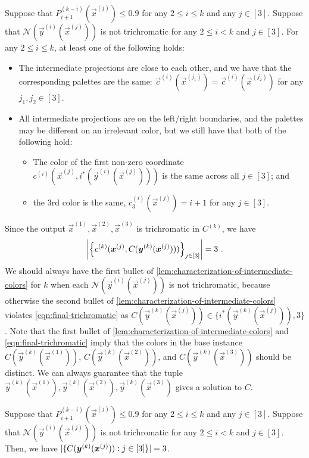 \begin{lemma}
    \label{lem:characterization-of-intermediate-colors}
    Suppose that $P_{i+1}^{(k-i)}(\vec{x}^{(j)})\leq 0.9$ for any $2\leq i\leq k$ and any $j\in [3]$.
    Suppose that $\mathcal{N}(\vec{y}^{(i)}(\vec{x}^{(j)}))$ is not trichromatic for any $2\leq i<k$ and $j\in [3]$. 
    For any $2\leq i\leq k$, at least one of the following holds:
    \begin{itemize}
        \item The intermediate projections are close to each other, and we have that the corresponding palettes are the same: $\vec{c}^{(i)}(\vec{x}^{(j_1)})=\vec{c}^{(i)}(\vec{x}^{(j_2)})$ for any $j_1,j_2\in [3]$.
        \item All intermediate projections are on the left/right boundaries, and the palettes may be different on an irrelevant color, but we still have that both of the following hold: 
        \begin{itemize}
            \item The color of the first non-zero coordinate $c^{(i)}\left(\vec{x}^{(j)}, i^*(\vec{y}^{(i)}(\vec{x}^{(j)}))\right)$ is the same across all  $j\in [3]$; and
            \item the 3rd color is the same, $c^{(i)}_3(\vec{x}^{(j)})=i+1$ for any $j\in [3]$.
        \end{itemize} 
    \end{itemize}
\end{lemma}

Since the output $\vec{x}^{(1)}, \vec{x}^{(2)}, \vec{x}^{(3)}$ is trichromatic in $C^{(k)}$, we have 
\begin{align}
    \label{eqn:final-trichromatic}
    \left |{\left \{{c^{(k)}(\boldsymbol{x}^{(j)},C(\boldsymbol{y}^{(k)}(\boldsymbol{x}^{(j)})))} \right \}_{j\in [3]}} \right |=3~.
\end{align}
We should always have the first bullet of \cref{lem:characterization-of-intermediate-colors} for $k$ when each $\mathcal{N}(\vec{y}^{(i)}(\vec{x}^{(j)}))$ is not trichromatic, because otherwise the second bullet of \cref{lem:characterization-of-intermediate-colors} violates \cref{eqn:final-trichromatic} as $C(\vec{y}^{(k)}(\vec{x}^{(j)}))\in \{i^*(\vec{y}^{(k)}(\vec{x}^{(j)})), 3\}$.
Note that
the first bullet of \cref{lem:characterization-of-intermediate-colors} and \cref{eqn:final-trichromatic} imply that the colors in the base instance $C(\vec{y}^{(k)}(\vec{x}^{(1)}))$, $C(\vec{y}^{(k)}(\vec{x}^{(2)}))$, and $C(\vec{y}^{(k)}(\vec{x}^{(3)}))$ should be distinct. 
We can always guarantee that the tuple $\vec{y}^{(k)}(\vec{x}^{(1)}), \vec{y}^{(k)}(\vec{x}^{(2)}), \vec{y}^{(k)}(\vec{x}^{(3)})$ gives a solution to $C$.
\begin{corollary}
    \label{cor:no-sols-in-sim-implies-final-ones}
    Suppose that $P_{i+1}^{(k-i)}(\vec{x}^{(j)})\leq 0.9$ for any $2\leq i\leq k$ and any $j\in [3]$.
    Suppose that $\mathcal{N}(\vec{y}^{(i)}(\vec{x}^{(j)}))$ is not trichromatic for any $2\leq i<k$ and $j\in [3]$. 
    Then, we have $|\{{C(\boldsymbol{y}^{(k)}(\boldsymbol{x}^{(j)})): j\in [3]} \}|=3$.
\end{corollary}


